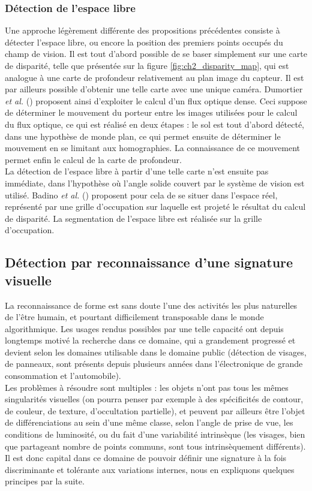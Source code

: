 \subsubsection{Détection de l'espace libre}
Une approche légèrement différente des propositions précédentes consiste à détecter l'espace libre, ou encore la position des premiers points occupés du champ de vision. Il est tout d'abord possible de se baser simplement sur une carte de disparité, telle que présentée sur la figure \ref{fig:ch2_disparity_map}, qui est analogue à une carte de profondeur relativement au plan image du capteur. Il est par ailleurs possible d'obtenir une telle carte avec une unique caméra. Dumortier \textit{et al.} (\cite{Dumortier}) proposent ainsi d'exploiter le calcul d'un flux optique dense. Ceci suppose de déterminer le mouvement du porteur entre les images utilisées pour le calcul du flux optique, ce qui est réalisé en deux étapes : le sol est tout d'abord détecté, dans une hypothèse de monde plan, ce qui permet ensuite de déterminer le mouvement en se limitant aux homographies. La connaissance de ce mouvement permet enfin le calcul de la carte de profondeur. \\
La détection de l'espace libre à partir d'une telle carte n'est ensuite pas immédiate, dans l'hypothèse où l'angle solide couvert par le système de vision est utilisé. Badino \textit{et al.} (\cite{Badino2007, Badino2009}) proposent pour cela de se situer dans l'espace réel, représenté par une grille d'occupation sur laquelle est projeté le résultat du calcul de disparité. La segmentation de l'espace libre est réalisée sur la grille d'occupation. 

\subsection{Détection par reconnaissance d'une signature visuelle} \label{sec:ch2_detection_reconnaissance}
La reconnaissance de forme est sans doute l'une des activités les plus naturelles de l'être humain, et pourtant difficilement transposable dans le monde algorithmique. Les usages rendus possibles par une telle capacité ont depuis longtemps motivé la recherche dans ce domaine, qui a grandement progressé et devient selon les domaines utilisable dans le domaine public (détection de visages, de panneaux, sont présents depuis plusieurs années dans l'électronique de grande consommation et l'automobile). \\
Les problèmes à résoudre sont multiples : les objets n'ont pas tous les mêmes singularités visuelles (on pourra penser par exemple à des spécificités de contour, de couleur, de texture, d'occultation partielle), et peuvent par ailleurs être l'objet de différenciations au sein d'une même classe, selon l'angle de prise de vue, les conditions de luminosité, ou du fait d'une variabilité intrinsèque (les visages, bien que partageant nombre de points communs, sont tous intrinsèquement différents). Il est donc capital dans ce domaine de pouvoir définir une signature à la fois discriminante et tolérante aux variations internes, nous en expliquons quelques principes par la suite.


